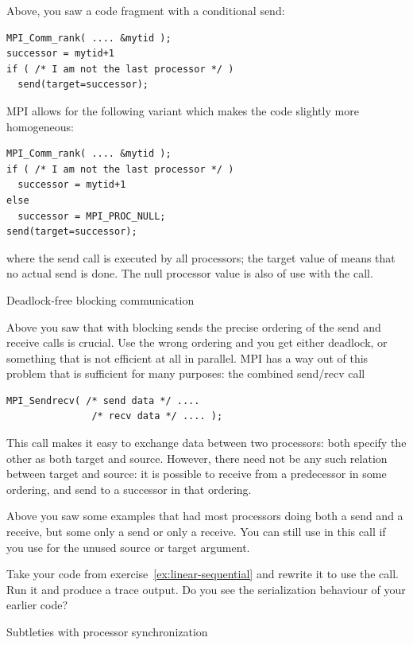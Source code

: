 Above, you saw a code fragment with a conditional send:
\begin{verbatim}
MPI_Comm_rank( .... &mytid );
successor = mytid+1
if ( /* I am not the last processor */ )
  send(target=successor);
\end{verbatim}
MPI allows for the following variant which makes the code slightly 
more homogeneous:
\begin{verbatim}
MPI_Comm_rank( .... &mytid );
if ( /* I am not the last processor */ )
  successor = mytid+1
else
  successor = MPI_PROC_NULL;
send(target=successor);
\end{verbatim}
where the send call is executed by all processors; the target value
of  means that no actual send is done. 
The null processor
value is also of use with the  call.

 {Deadlock-free blocking communication}

Above you saw that with blocking sends the precise ordering of the
send and receive calls is crucial. Use the wrong ordering and you get
either deadlock, or something that is not efficient at all in
parallel. MPI has a way out of this problem that is sufficient for
many purposes: the combined send/recv call
\begin{verbatim}
MPI_Sendrecv( /* send data */ ....
               /* recv data */ .... );
\end{verbatim}
This call makes it easy to exchange data between two processors: both
specify the other as both target and source. However, there need not
be any such relation between target and source: it is possible to
receive from a predecessor in some ordering, and send to a successor
in that ordering.

Above you saw some examples that had most processors doing both a send and
a receive, but some only a send or only a receive. You can still use
 in this call if you use  for
the unused source or target argument.

\begin{exercise}
\label{ex:linear-sendrecv}
  Take your code from exercise~\ref{ex:linear-sequential}
  and rewrite it to use the  call. Run it and
  produce a trace output. Do you see the serialization behaviour
  of your earlier code?
\end{exercise}


 {Subtleties with processor synchronization}
\label{sec:handshake}

